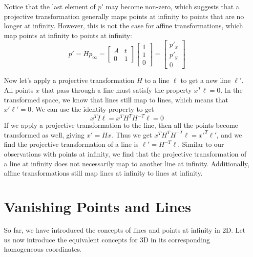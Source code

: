 \documentclass[a4paper, 12pt]{article}
\begin{document}
Notice that the last element of $p'$ may become non-zero, which suggests that a projective transformation generally maps points at infinity to points that are no longer at infinity. However, this is not the case for affine transformations, which map points at infinity to points at infinity:
\begin{equation}
p' =Hp_\infty = \begin{bmatrix} A &t \\ 0&1 \end{bmatrix}\begin{bmatrix}1\\1\\0\end{bmatrix} = \begin{bmatrix}p'_x\\ p'_y\\0\end{bmatrix}
\end{equation}

Now let's apply a projective transformation $H$ to a line $\ell$ to get a new line $\ell'$. All points $x$ that pass through a line must satisfy the property $x^T\ell = 0$. In the transformed space, we know that lines still map to lines, which means that $x'\ell' = 0$. We can use the identity property to get \[x^TI\ell = x^TH^T H^{-T} \ell = 0\]If we apply a projective transformation to the line, then all the points become transformed as well, giving $x' = Hx$. Thus we get $x^TH^T H^{-T} \ell = x'^T\ell'$, and we find the projective transformation of a line is $\ell' = H^{-T}\ell$. Similar to our observations with points at infinity, we find that the projective transformation of a line at infinity does not necessarily map to another line at infinity. Additionally, affine transformations still map lines at infinity to lines at infinity.

\section{Vanishing Points and Lines}
So far, we have introduced the concepts of lines and points at infinity in 2D. Let us now introduce the equivalent concepts for 3D in its corresponding homogeneous coordinates. 
\end{document}
